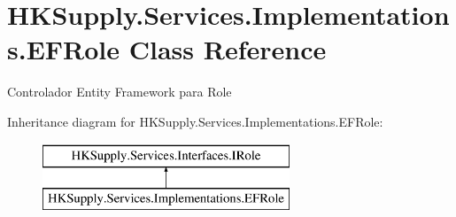 \hypertarget{class_h_k_supply_1_1_services_1_1_implementations_1_1_e_f_role}{}\section{H\+K\+Supply.\+Services.\+Implementations.\+E\+F\+Role Class Reference}
\label{class_h_k_supply_1_1_services_1_1_implementations_1_1_e_f_role}


Controlador Entity Framework para Role  


Inheritance diagram for H\+K\+Supply.\+Services.\+Implementations.\+E\+F\+Role\+:\begin{figure}[H]
\begin{center}
\leavevmode
\includegraphics[height=2.000000cm]{class_h_k_supply_1_1_services_1_1_implementations_1_1_e_f_role}
\end{center}
\end{figure}
